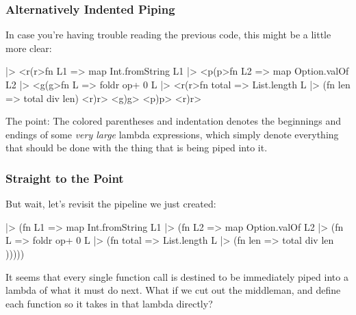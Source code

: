 \documentclass[aspectratio=169, handout]{beamer}
\begin{document}
\begin{frame}[fragile]
  \frametitle{Alternatively Indented Piping}

  In case you're having trouble reading the previous code, this might be
  a little more clear:

  \begin{codeblock}
    ["1", "2", "3"] |> <r(r>fn L1 =>
      map Int.fromString L1 |> <p(p>fn L2 =>
        map Option.valOf L2 |> <g(g>fn L =>
          foldr op+ 0 L |> <r(r>fn total =>
            List.length L |> (fn len => total div len)
          <r)r>
        <g)g>
      <p)p>
    <r)r>
  \end{codeblock}

  \pause
  \vspace{\fill}

  The point: The colored parentheses and indentation denotes the beginnings
  and endings of some \textit{very large} lambda expressions, which simply
  denote everything that should be done with the thing that is being piped
  into it.
\end{frame}

\begin{frame}[fragile]
  \frametitle{Straight to the Point}

  But wait, let's revisit the pipeline we just created:

  \begin{codeblock}
    ["1", "2", "3"]       |> (fn L1 =>
    map Int.fromString L1 |> (fn L2 =>
    map Option.valOf L2   |> (fn L =>
    foldr op+ 0 L         |> (fn total =>
    List.length L         |> (fn len =>
    total div len         )))))
  \end{codeblock}

  \pause
  \vspace{\fill}

  It seems that every single function call is destined to be immediately
  piped into a lambda of what it must do next. What if we cut out
  the middleman, and define each function so it takes in that lambda directly?
\end{frame}
\end{document}
